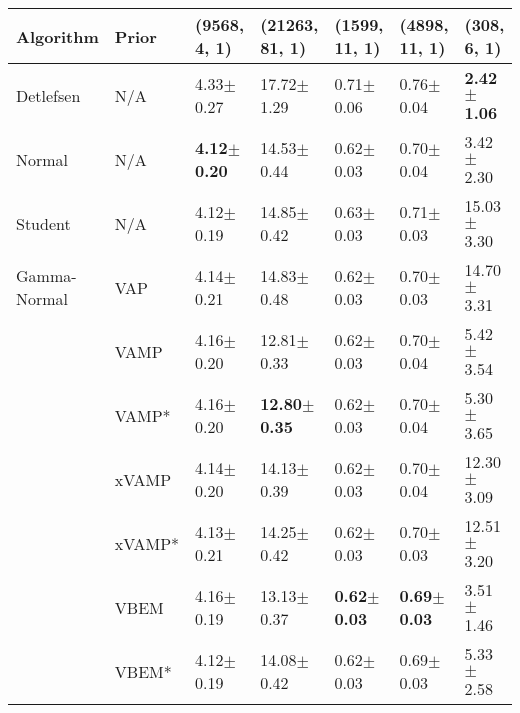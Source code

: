 \begin{tabular}{lllllll}
Algorithm & Prior& (9568, 4, 1)& (21263, 81, 1)& (1599, 11, 1)& (4898, 11, 1)& (308, 6, 1)\\
\midrule
Detlefsen & N/A &           4.33$\pm$0.27 &           17.72$\pm$1.29 &           0.71$\pm$0.06 &           0.76$\pm$0.04 &  \textbf{2.42$\pm$1.06} \\
Normal & N/A &  \textbf{4.12$\pm$0.20} &           14.53$\pm$0.44 &           0.62$\pm$0.03 &           0.70$\pm$0.04 &           3.42$\pm$2.30 \\
Student & N/A &           4.12$\pm$0.19 &           14.85$\pm$0.42 &           0.63$\pm$0.03 &           0.71$\pm$0.03 &          15.03$\pm$3.30 \\
Gamma-Normal & VAP &           4.14$\pm$0.21 &           14.83$\pm$0.48 &           0.62$\pm$0.03 &           0.70$\pm$0.03 &          14.70$\pm$3.31 \\
             & VAMP &           4.16$\pm$0.20 &           12.81$\pm$0.33 &           0.62$\pm$0.03 &           0.70$\pm$0.04 &           5.42$\pm$3.54 \\
             & VAMP* &           4.16$\pm$0.20 &  \textbf{12.80$\pm$0.35} &           0.62$\pm$0.03 &           0.70$\pm$0.04 &           5.30$\pm$3.65 \\
             & xVAMP &           4.14$\pm$0.20 &           14.13$\pm$0.39 &           0.62$\pm$0.03 &           0.70$\pm$0.04 &          12.30$\pm$3.09 \\
             & xVAMP* &           4.13$\pm$0.21 &           14.25$\pm$0.42 &           0.62$\pm$0.03 &           0.70$\pm$0.03 &          12.51$\pm$3.20 \\
             & VBEM &           4.16$\pm$0.19 &           13.13$\pm$0.37 &  \textbf{0.62$\pm$0.03} &  \textbf{0.69$\pm$0.03} &           3.51$\pm$1.46 \\
             & VBEM* &           4.12$\pm$0.19 &           14.08$\pm$0.42 &           0.62$\pm$0.03 &           0.69$\pm$0.03 &           5.33$\pm$2.58 \\
\bottomrule
\end{tabular}

